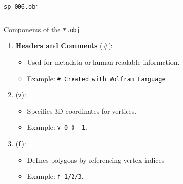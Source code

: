 %    


\renewcommand{\listingFontSize}{\scriptsize} 
\begin{frame}[fragile]{\texttt{sp-006.obj}}
    \begin{columns}[T] %
        \lstset{style=obj} %
        
        \lstset{style=obj} %
    \end{columns}
\end{frame}


\begin{frame}{Components of the \texttt{*.obj}}
    \begin{enumerate}
        \item \textbf{Headers and Comments} (\#):
            \begin{itemize}
                \item Used for metadata or human-readable information.
                \item Example: \texttt{\# Created with Wolfram Language}.
            \end{itemize}

        \item {} (\texttt{v}):
            \begin{itemize}
                \item Specifies 3D coordinates for vertices.
                \item Example: \texttt{v 0 0 -1}.
            \end{itemize}

        \item {} (\texttt{f}):
            \begin{itemize}
                \item Defines polygons by referencing vertex indices.
                \item Example: \texttt{f 1/2/3}.
            \end{itemize}
    \end{enumerate}
        \setcounter{listnumber}{\value{enumi}}
\end{frame}

